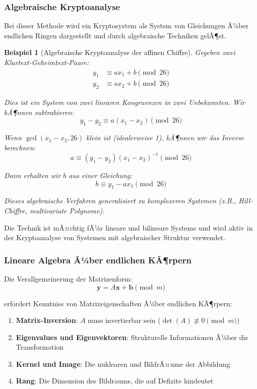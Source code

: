 ﻿\documentclass[12pt,a4paper]{article}
\newtheorem{example}{Beispiel}
\begin{document}
	\subsubsection{Algebraische Kryptoanalyse}
	
	Bei dieser Methode wird ein Kryptosystem als System von Gleichungen Ã¼ber endlichen Ringen dargestellt und durch algebraische Techniken gelÃ¶st.
	
	\begin{example}[Algebraische Kryptoanalyse der affinen Chiffre]
		Gegeben zwei Klartext-Geheimtext-Paare:
		\begin{align}
			y_1 &\equiv ax_1 + b \pmod{26} \\
			y_2 &\equiv ax_2 + b \pmod{26}
		\end{align}
		
		Dies ist ein System von zwei linearen Kongruenzen in zwei Unbekannten. Wir kÃ¶nnen subtrahieren:
		\begin{equation}
			y_1 - y_2 \equiv a(x_1 - x_2) \pmod{26}
		\end{equation}
		
		Wenn $\gcd(x_1 - x_2, 26)$ klein ist (idealerweise 1), kÃ¶nnen wir das Inverse berechnen:
		\begin{equation}
			a \equiv (y_1 - y_2)(x_1 - x_2)^{-1} \pmod{26}
		\end{equation}
		
		Dann erhalten wir $b$ aus einer Gleichung:
		\begin{equation}
			b \equiv y_1 - ax_1 \pmod{26}
		\end{equation}
		
		Dieses algebraische Verfahren generalisiert zu komplexeren Systemen (z.B., Hill-Chiffre, multivariate Polynome).
	\end{example}
	
	Die Technik ist mÃ¤chtig fÃ¼r lineare und bilineare Systeme und wird aktiv in der Kryptoanalyse von Systemen mit algebraischer Struktur verwendet.
	
	\subsubsection{Lineare Algebra Ã¼ber endlichen KÃ¶rpern}
	
	Die Verallgemeinerung der Matrizenform:
	\begin{equation}
		\mathbf{y} = A\mathbf{x} + \mathbf{b} \pmod{m}
	\end{equation}
	
	erfordert Kenntniss von Matrixeigenschaften Ã¼ber endlichen KÃ¶rpern:
	\begin{enumerate}
		\item \textbf{Matrix-Inversion}: $A$ muss invertierbar sein ($\det(A) \not\equiv 0 \pmod{m}$)
		\item \textbf{Eigenvalues und Eigenvektoren}: Strukturelle Informationen Ã¼ber die Transformation
		\item \textbf{Kernel und Image}: Die nuklearen und BildrÃ¤ume der Abbildung
		\item \textbf{Rang}: Die Dimension des Bildraums, die auf Defizite hindeutet
	\end{enumerate}
	
\end{document}
